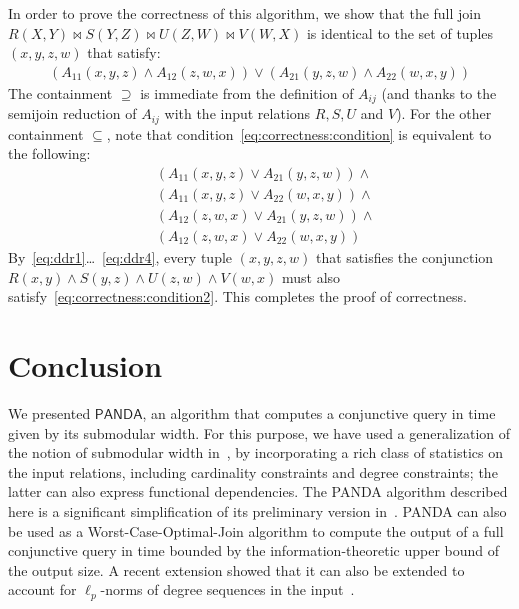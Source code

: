 \documentclass[10pt,a4paper]{article}
\newcommand{\panda}{\textsf{PANDA}\xspace}
\begin{document}
    In order to prove the correctness of this algorithm, we show that the full join $R(X, Y)\Join S(Y, Z)\Join U(Z, W)\Join V(W, X)$ is identical to the set of tuples $(x, y, z, w)$ that satisfy:
    \begin{align}
        (A_{11}(x, y, z) \wedge A_{12}(z, w, x)) \vee
        (A_{21}(y, z, w) \wedge A_{22}(w, x, y))
        \label{eq:correctness:condition}
    \end{align}
    The containment $\supseteq$ is immediate from the definition of $A_{ij}$ (and thanks to the semijoin reduction of $A_{ij}$ with the input relations $R, S, U$ and $V$). For the other containment $\subseteq$, note that condition~\eqref{eq:correctness:condition} is equivalent to the following:
    \begin{align}
        \label{eq:correctness:condition2}
        &(A_{11}(x, y, z) \vee A_{21}(y, z, w)) \wedge\\
        &(A_{11}(x, y, z) \vee A_{22}(w, x, y)) \wedge\nonumber\\
        &(A_{12}(z, w, x) \vee A_{21}(y, z, w)) \wedge\nonumber\\
        &(A_{12}(z, w, x) \vee A_{22}(w, x, y)) \nonumber
    \end{align}
    By~\eqref{eq:ddr1}\ldots~\eqref{eq:ddr4}, every tuple $(x, y, z, w)$ that satisfies the conjunction $R(x, y)\wedge S(y, z)\wedge U(z, w)\wedge V(w, x)$ must also satisfy~\eqref{eq:correctness:condition2}. This completes the proof of correctness.

\section{Conclusion}
\label{sec:conclusion}

We presented $\panda$, an algorithm that computes a conjunctive query in time given by its
submodular width.  For this purpose, we have used a generalization of the notion of
submodular width in~\cite{DBLP:journals/jacm/Marx13}, by incorporating a rich class of
statistics on the input relations, including cardinality constraints and degree constraints;
the latter can also express functional dependencies. The \panda algorithm described here is
a significant simplification of its preliminary version in~\cite{DBLP:conf/pods/Khamis0S17}.
\panda can also be used as a Worst-Case-Optimal-Join algorithm to compute the output of a
full conjunctive query in time bounded by the information-theoretic upper bound of the
output size. A recent extension showed that it can also be extended to account for
$\ell_p$-norms of degree sequences in the input~\cite{10.1145/3651597}.
\end{document}
